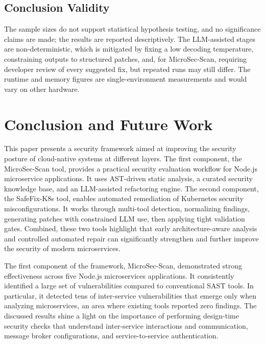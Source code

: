 \documentclass[preprint,12pt]{elsarticle}
\newcommand{\new}[1]{#1}
\begin{document}
\new{\subsection{Conclusion Validity}}

\new{The sample sizes do not support statistical hypothesis testing, and no
significance claims are made; the results are reported descriptively. The
LLM-assisted stages are non-deterministic, which is mitigated by fixing a low
decoding temperature, constraining outputs to structured patches, and, for
MicroSec-Scan, requiring developer review of every suggested fix, but repeated
runs may still differ. The runtime and memory figures are single-environment
measurements and would vary on other hardware.}



\section{Conclusion and Future Work}

This paper presents a security framework aimed at improving the security posture of cloud-native systems at different layers. The first component, the MicroSec-Scan tool, provides a practical security evaluation workflow for Node.js microservice applications. It uses AST-driven static analysis, a curated security knowledge base, and an LLM-assisted refactoring engine. The second component, the SafeFix-K8s tool, enables automated remediation of Kubernetes security misconfigurations. It works through multi-tool detection, normalizing findings, generating patches with constrained LLM use, then applying tight validation gates. Combined, these two tools highlight that early architecture-aware analysis and controlled automated repair can significantly strengthen and further improve the security of modern microservices.

The first component of the framework, MicroSec-Scan, demonstrated strong effectiveness across five Node.js microservices applications. It consistently identified a large set of vulnerabilities compared to conventional SAST tools. In particular, it detected tens of inter-service vulnerabilities that emerge only when analyzing microservices, an area where existing tools reported zero findings. The discussed results shine a light on the importance of performing design-time security checks that understand inter-service interactions and communication, message broker configurations, and service-to-service authentication.
\end{document}
